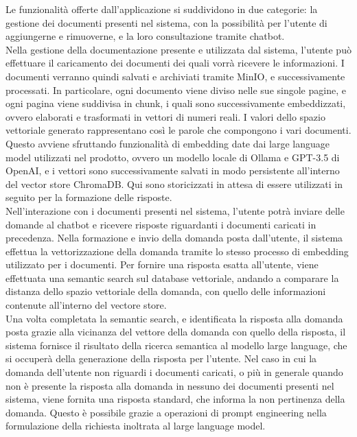 \noindent Le funzionalità offerte dall’applicazione si suddividono in due categorie: la gestione dei documenti presenti nel sistema, con la possibilità per l’utente di aggiungerne e rimuoverne, e la loro consultazione tramite chatbot.\\
Nella gestione della documentazione presente e utilizzata dal sistema, l’utente può effettuare il caricamento dei documenti dei quali vorrà ricevere le informazioni. I documenti verranno quindi salvati e archiviati tramite MinIO, e successivamente processati. In particolare, ogni documento viene diviso nelle sue singole pagine, e ogni pagina viene suddivisa in chunk, i quali sono successivamente embeddizzati, ovvero elaborati e trasformati in vettori di numeri reali. I valori dello spazio vettoriale generato rappresentano così le parole che compongono i vari documenti. Questo avviene sfruttando funzionalità di embedding date dai large language model utilizzati nel prodotto, ovvero un modello locale di Ollama e GPT-3.5 di OpenAI, e i vettori sono successivamente salvati in modo persistente all’interno del vector store ChromaDB. Qui sono storicizzati in attesa di essere utilizzati in seguito per la formazione delle risposte.\\
Nell’interazione con i documenti presenti nel sistema, l’utente potrà inviare delle domande al chatbot e ricevere risposte riguardanti i documenti caricati in precedenza. Nella formazione e invio della domanda posta dall’utente, il sistema effettua la vettorizzazione della domanda tramite lo stesso processo di embedding utilizzato per i documenti. Per fornire una risposta esatta all’utente, viene effettuata una semantic search sul database vettoriale, andando a comparare la distanza dello spazio vettoriale della domanda, con quello delle informazioni contenute all’interno del vectore store.\\
Una volta completata la semantic search, e identificata la risposta alla domanda posta grazie alla vicinanza del vettore della domanda con quello della risposta, il sistema fornisce il risultato della ricerca semantica al modello large language, che si occuperà della generazione della risposta per l’utente. Nel caso in cui la domanda dell’utente non riguardi i documenti caricati, o più in generale quando non è presente la risposta alla domanda in nessuno dei documenti presenti nel sistema, viene fornita una risposta standard, che informa la non pertinenza della domanda. Questo è possibile grazie a operazioni di prompt engineering nella formulazione della richiesta inoltrata al large language model.\\
